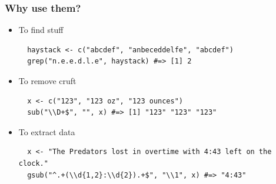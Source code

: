 \documentclass{beamer}
\begin{document}
\begin{frame}[fragile]
  \frametitle{Why use them?}
  \begin{itemize}[<+->]
    \item To find stuff
      \vspace{3mm}

\begin{verbatim}
  haystack <- c("abcdef", "anbeceddelfe", "abcdef")
  grep("n.e.e.d.l.e", haystack) #=> [1] 2
\end{verbatim}

      \vspace{3mm}

    \item To remove cruft
      \vspace{3mm}

\begin{verbatim}
  x <- c("123", "123 oz", "123 ounces")
  sub("\\D+$", "", x) #=> [1] "123" "123" "123"
\end{verbatim}

      \vspace{3mm}

    \item To extract data
      \vspace{3mm}

\begin{verbatim}
  x <- "The Predators lost in overtime with 4:43 left on the clock."
  gsub("^.+(\\d{1,2}:\\d{2}).+$", "\\1", x) #=> "4:43"
\end{verbatim}

      \vspace{3mm}

  \end{itemize}
\end{frame}
\end{document}
